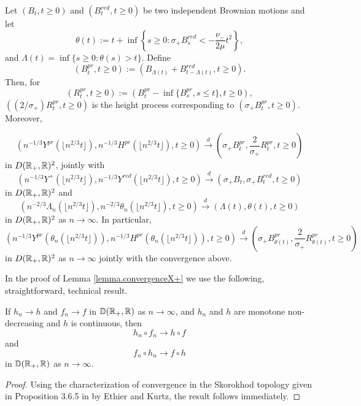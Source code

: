 \begin{lemma}\label{lemma.convergenceX+}
Let $(B_t, t \geq 0)$ and $(B^{red}_t, t\geq 0)$ be two independent Brownian motions and let $$\theta(t):=t+\inf\left\{s\geq 0 : \sigma_+ B^{red}_s< -\frac{\nu_-}{2\mu} t^2\right\},$$ and $\Lambda(t)=\inf\{s\geq 0:\theta(s)> t\}$. Define \begin{equation}\label{eq.definitionBpr}\left(B^{pr}_t,t \geq 0\right):=\left( B_{\Lambda(t)}+ B^{red}_{t-\Lambda(t)}, t\geq 0\right).\end{equation}
Then, for $$(R^{pr}_t, t\geq 0):=\left(B^{pr}_t-\inf\{B^{pr}_s,s\leq t\},t\geq 0\right),$$
$\left((2/\sigma_+)R^{pr}_t, t\geq 0\right)$
is the height process corresponding to $\left(\sigma_+ B^{pr}_t,t \geq 0\right)$.
Moreover,

\begin{equation}\label{eq.convergenceYpr} \left(n^{-1/3}Y^{pr}\left( \lfloor n^{2/3}t \rfloor \right), n^{-1/3}H^{pr}\left( \lfloor n^{2/3}t \rfloor \right),t\geq 0\right)\overset{d}{\to}\left( \sigma_+ B^{pr}_{t} ,\frac{2}{\sigma_+}R^{pr}_t, t\geq 0\right)\end{equation}
in $D({\mathbb R}_+,{\mathbb R})^2$, jointly with 
$$\left(n^{-1/3}Y^+\left(\lfloor n^{2/3}t \rfloor \right), n^{-1/3}Y^{red}\left(\lfloor n^{2/3}t \rfloor \right), t\geq 0\right) \overset{d}{\to}\left(\sigma_+ B_t,\sigma_+ B^{red}_t, t\geq 0\right)$$
in $D({\mathbb R}_+,{\mathbb R})^2$ and 
$$\left(n^{-2/3} \Lambda_n\left(\lfloor n^{2/3}t\rfloor \right), n^{-2/3}\theta_n\left(\lfloor n^{2/3}t\rfloor \right),t\geq 0\right)\overset{d}{\to}\left(\Lambda(t),\theta(t), t\geq 0 \right)$$
in $D({\mathbb R}_+,{\mathbb R})^2$ as $n\to \infty$. 
In particular, 
\begin{equation}\label{eq.convergencecompSprandtheta}\left(n^{-1/3}Y^{pr}\left(\theta_n \left(\lfloor n^{2/3}t\rfloor \right)\right), n^{-1/3}H^{pr}\left(\theta_n\left(\lfloor n^{2/3}t\rfloor \right) \right),t\geq 0 \right) \overset{d}{\to} \left(\sigma_+ B^{pr}_{\theta(t)}, \frac{2}{\sigma_+}R^{pr}_{\theta(t)},t\geq 0\right)\end{equation}
in $D({\mathbb R}_+,{\mathbb R})^2$ as $n\to \infty$ jointly with the convergence above.
\end{lemma}
In the proof of Lemma \ref{lemma.convergenceX+} we use the following, straightforward, technical result. 

\begin{lemma}\label{lemma.technicalcomposedfunctions}
If $h_n\to h$ and $f_n\to f$ in ${\mathbb D}({\mathbb R}_+,{\mathbb R})$ as $n\to\infty$, and $h_n$ and $h$ are monotone non-decreasing and $h$ is continuous, then 
$$h_n\circ f_n \to h\circ f$$
and 
$$f_n\circ h_n \to f\circ h$$
in ${\mathbb D}({\mathbb R}_+,{\mathbb R})$ as $n\to\infty$.
\end{lemma}
\begin{proof}
Using the characterization of convergence in the Skorokhod topology given in Proposition 3.6.5 in \cite{Ethier1986} by Ethier and Kurtz, the result follows immediately.
\end{proof}


